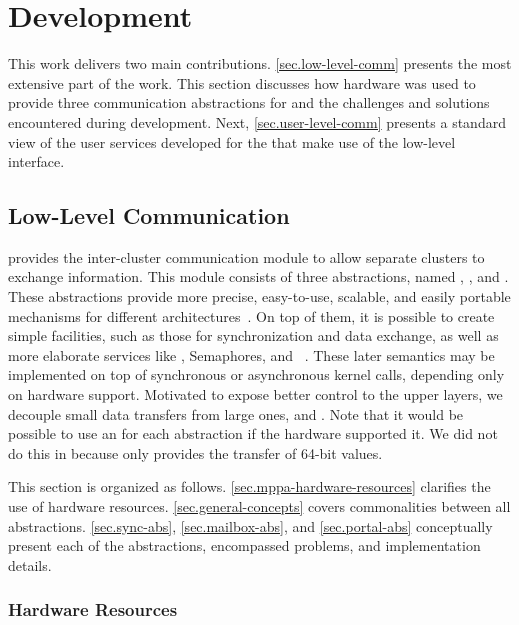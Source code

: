 \chapter{Development}
\label{ch.development}

	This work delivers two main contributions.
	\autoref{sec.low-level-comm} presents the most extensive part of the
	work. This section
	discusses how \mppa hardware was used to provide three communication abstractions for
	\nanvix \textit{\hal} and the challenges and solutions encountered during development.
	Next, \autoref{sec.user-level-comm} presents a standard view of the user services
	developed for the \nanvix \microkernel that make use of the low-level interface.

	\section{Low-Level Communication}
	\label{sec.low-level-comm}

		\nanvix \textit{\hal} provides the inter-cluster communication module to allow separate
		clusters to exchange information.
		This module consists of three abstractions, named \sync, \mailbox, and \portal.
		These abstractions provide more precise, easy-to-use, scalable, and easily
		portable mechanisms for different architectures~\cite{wentzlaff_fleets:_2011}.
		On top of them, it is possible to create simple
		facilities, such
		as those for synchronization and data exchange, as well as more elaborate services
		like \shm, \posix Semaphores, and \rmem~\cite{penna:rmen}.
		These later semantics may be implemented on top of synchronous
		or asynchronous kernel calls, depending only on hardware support.
		Motivated to expose better \qos control to the upper layers, we decouple small data
		transfers from large ones, \ie \mailbox and \portal.
		Note that it would be possible to use an \noc for each abstraction if the hardware supported it.
		We did not do this in \mppa because \cnoc only provides the transfer of 64-bit values.
		
		This section is organized as follows.
		\autoref{sec.mppa-hardware-resources} clarifies the use of \mppa hardware resources.
		\autoref{sec.general-concepts} covers commonalities between all abstractions.
		\autoref{sec.sync-abs},
		\autoref{sec.mailbox-abs}, and
		\autoref{sec.portal-abs}
		conceptually present each of the abstractions, encompassed problems, and 
		implementation details.

		\subsection{\mppa Hardware Resources}
		\label{sec.mppa-hardware-resources}

